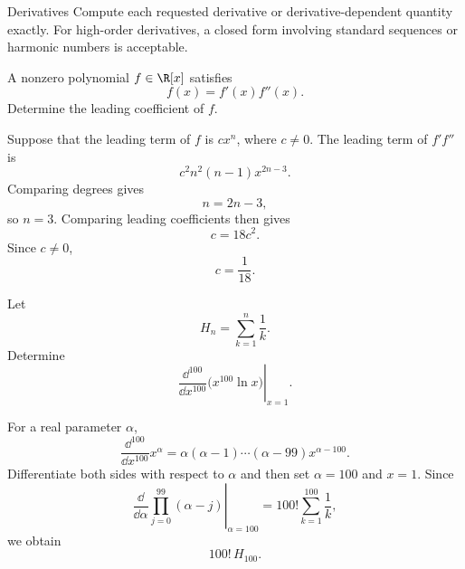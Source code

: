     \begin{expectedproblemgroup}{Derivatives}
        Compute each requested derivative or derivative-dependent quantity
        exactly. For high-order derivatives, a closed form involving standard
        sequences or harmonic numbers is acceptable.

        \begin{expectedsubproblem}[2006 HMMT]
            A nonzero polynomial $f\in\R[x]$ satisfies
            \[
                f(x)=f'(x)f''(x).
            \]
            Determine the leading coefficient of $f$.
        \end{expectedsubproblem}

        \begin{expectedsubsolution}
            Suppose that the leading term of $f$ is $cx^n$, where $c\neq0$. The
            leading term of $f'f''$ is
            \[
                c^2n^2(n-1)x^{2n-3}.
            \]
            Comparing degrees gives
            \[
                n=2n-3,
            \]
            so $n=3$. Comparing leading coefficients then gives
            \[
                c=18c^2.
            \]
            Since $c\neq0$,
            \[
                \boxed{c=\frac{1}{18}}.
            \]
        \end{expectedsubsolution}




        \begin{expectedsubproblem}
            Let
            \[
                H_n=\sum_{k=1}^{n}\frac{1}{k}.
            \]
            Determine
            \[
                \left.
                \frac{\dd^{100}}{\dd x^{100}}
                \bigl(x^{100}\ln x\bigr)
                \right|_{x=1}.
            \]
        \end{expectedsubproblem}

        \begin{expectedsubsolution}
            For a real parameter $\alpha$,
            \[
                \frac{\dd^{100}}{\dd x^{100}}x^\alpha
                =
                \alpha(\alpha-1)\cdots(\alpha-99)x^{\alpha-100}.
            \]
            Differentiate both sides with respect to $\alpha$ and then set
            $\alpha=100$ and $x=1$. Since
            \[
                \left.
                \frac{\dd}{\dd\alpha}
                \prod_{j=0}^{99}(\alpha-j)
                \right|_{\alpha=100}
                =
                100!\sum_{k=1}^{100}\frac{1}{k},
            \]
            we obtain
            \[
                \boxed{100!\,H_{100}}.
            \]
        \end{expectedsubsolution}

    \end{expectedproblemgroup}

